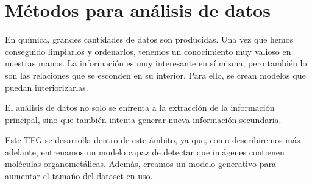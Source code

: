 \section*{Métodos para análisis de datos}
En química, grandes cantidades de datos son producidas. Una vez que hemos conseguido limpiarlos y ordenarlos, tenemos un conocimiento muy valioso en nuestras manos. La información es muy interesante en sí misma, pero también lo son las relaciones que se esconden en su interior. Para ello, se crean modelos que puedan interiorizarlas.

El análisis de datos no solo se enfrenta a la extracción de la información principal, sino que también intenta generar nueva información secundaria. \cite{doi:10.1021/ci600234z}

Este TFG se desarrolla dentro de este ámbito, ya que, como describiremos más adelante, entrenamos un modelo capaz de detectar que imágenes contienen moléculas organometálicas. Además, creamos un modelo generativo para aumentar el tamaño del dataset en uso.
